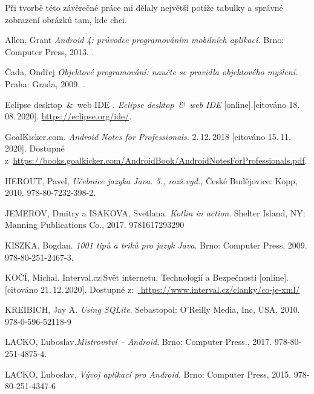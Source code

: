 \documentclass{vskpou} %
\begin{document}
Při tvorbě této závěrečné práce mi dělaly největší potíže tabulky a správné zobrazení obrázků tam, kde chci.


\newpage













\begin{thebibliography}{9}



 Allen, Grant \textit{Android 4: průvodce programováním mobilních aplikací.} Brno: Computer Press, 2013. .

 Čada, Ondřej \textit{Objektové programování: naučte se pravidla objektového myšlení.} Praha: Grada, 2009. .


 Eclipse desktop \,\&\, web IDE . \textit{Eclipse desktop \,\&\, web IDE } [online].[citováno 18.\,08.\,2020].
\url{https://eclipse.org/ide/}.

 GoalKicker.com. \textit{Android Notes for Professionals.} 2.\,12.\,2018 [citováno 15.\,11.\,2020].
Dostupné z~\url{https://books.goalkicker.com/AndroidBook/AndroidNotesForProfessionals.pdf}.

 HEROUT, Pavel, \textit{Učebnice jazyka Java. 5., rozš.vyd.,} České Budějovice: Kopp, 2010. 978-80-7232-398-2.

 JEMEROV, Dmitry a ISAKOVA, Svetlana. \textit{Kotlin in action}. Shelter Island, NY: Manning Publications Co., 2017. 9781617293290

 KISZKA, Bogdan. \textit{1001 tipů a triků pro jazyk Java}. Brno: Computer Press, 2009. 978-80-251-2467-3.

 KOČÍ, Michal. Interval.cz|Svět internetu, Technologií a Bezpečnosti [online].[citováno 21.\,12.\,2020]. Dostupné z:~\url{ https://www.interval.cz/clanky/co-je-xml/}

 KREIBICH, Jay A. \textit{Using SQLite}. Sebastopol: O'Reilly Media, Inc, USA, 2010. 978-0-596-52118-9

 LACKO, Ľuboslav.\textit{Mistrovství -- Android}. Brno: Computer Press., 2017. 978-80-251-4875-4.


 LACKO, Ľuboslav, \textit{Vývoj aplikací pro Android}. Brno: Computer Press, 2015.
978-80-251-4347-6



\end{thebibliography}
\end{document}
